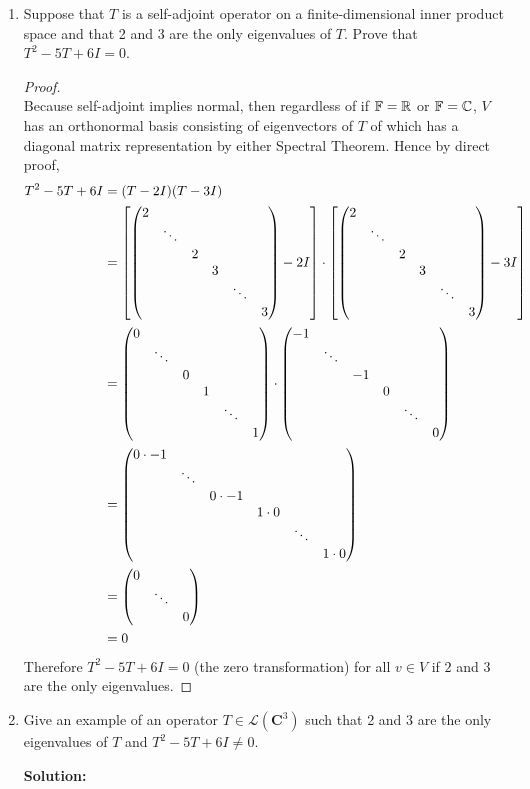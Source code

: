 \begin{enumerate}
    \item Suppose that $T$ is a self-adjoint operator on a finite-dimensional inner product space and that 2 and 3 are the only eigenvalues of $T$.  Prove that $T^2-5T+6I=0$.
    \begin{proof}$\;$\\
        Because self-adjoint implies normal, then regardless of if $\mathbb{F} = \mathbb{R}$ or $\mathbb{F} = \mathbb{C}$, $V$ has an orthonormal basis consisting of eigenvectors of $T$ of which has a diagonal matrix representation by either Spectral Theorem. Hence by direct proof, 
        \begin{align*}
            T^2 - 5T + 6I &= (T-2I)(T-3I)\\
            &= \brac{ \mqty(\dmat[]{2}{\ddots}{2}{3}{\ddots}{3}) - 2I} \cdot \brac{\mqty(\dmat[]{2}{\ddots}{2}{3}{\ddots}{3}) - 3I}\\
            &= \mqty(\dmat[]{0}{\ddots}{0}{1}{\ddots}{1}) \cdot \mqty(\dmat[]{-1}{\ddots}{-1}{0}{\ddots}{0})\\
            &= \mqty(\dmat[]{0 \cdot -1}{\ddots}{0 \cdot -1}{1 \cdot 0}{\ddots}{1\cdot 0})\\
            &= \mqty(\dmat{0}{\ddots}{0})\\
            &= 0
        \end{align*}
        Therefore $T^2-5T+6I=0$ (the zero transformation) for all $v \in V$  if $2$ and $3$ are the only eigenvalues.
    \end{proof}
    \newpage
    \item Give an example of an operator $T \in \mathcal{L}(\mathbf{C}^3)$ such that 2 and 3 are the only eigenvalues of $T$ and $T^2-5T+6I \ne 0$.

    \nnl \textbf{Solution: }
        

\end{enumerate}
